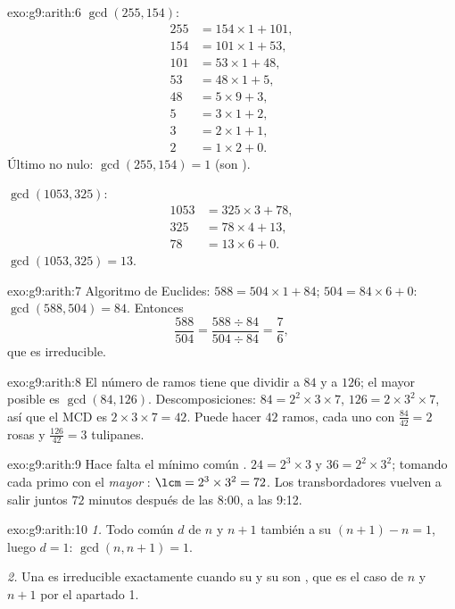 \begin{solution}{exo:g9:arith:6}
$\gcd(255, 154)$:
\begin{align*}
255 &= 154 \times 1 + 101, \\
154 &= 101 \times 1 + 53, \\
101 &= 53 \times 1 + 48, \\
53 &= 48 \times 1 + 5, \\
48 &= 5 \times 9 + 3, \\
5 &= 3 \times 1 + 2, \\
3 &= 2 \times 1 + 1, \\
2 &= 1 \times 2 + 0 .
\end{align*}
Último  no nulo: $\gcd(255, 154) = 1$ (son ).

$\gcd(1053, 325)$:
\begin{align*}
1053 &= 325 \times 3 + 78, \\
325 &= 78 \times 4 + 13, \\
78 &= 13 \times 6 + 0 .
\end{align*}
$\gcd(1053, 325) = 13$.
\end{solution}

\begin{solution}{exo:g9:arith:7}
Algoritmo de Euclides: $588 = 504 \times 1 + 84$; $504 = 84 \times 6 + 0$:
$\gcd(588, 504) = 84$. Entonces
\[
\frac{588}{504} = \frac{588 \div 84}{504 \div 84} = \frac{7}{6},
\]
que es irreducible.
\end{solution}

\begin{solution}{exo:g9:arith:8}
El número de ramos tiene que dividir a $84$ y a $126$; el mayor
posible es $\gcd(84, 126)$. Descomposiciones: $84 = 2^2 \times 3 \times
7$, $126 = 2 \times 3^2 \times 7$, así que el MCD es $2 \times 3 \times 7 =
42$. Puede hacer $42$ ramos, cada uno con
$\frac{84}{42} = 2$ rosas y $\frac{126}{42} = 3$ tulipanes.
\end{solution}

\begin{solution}{exo:g9:arith:9}
Hace falta el mínimo común . $24 = 2^3 \times 3$ y
$36 = 2^2 \times 3^2$; tomando cada primo con el \emph{mayor}
: $\lcm = 2^3 \times 3^2 = 72$. Los transbordadores vuelven a salir juntos
$72$ minutos después de las 8:00, a las 9:12.
\end{solution}

\begin{solution}{exo:g9:arith:10}
\emph{1.} Todo  común $d$ de $n$ y $n+1$  también a su
 $(n+1) - n = 1$, luego $d = 1$: $\gcd(n, n+1) = 1$.

\emph{2.} Una  es irreducible exactamente cuando su  y su
 son , que es el caso de $n$ y $n + 1$ por el apartado
1.
\end{solution}

